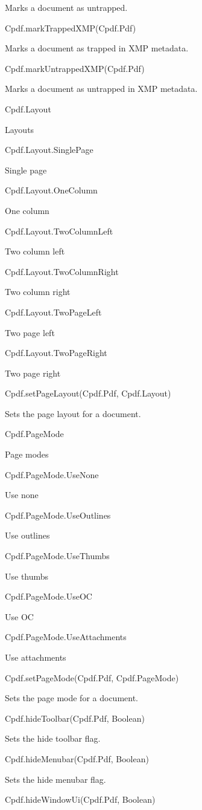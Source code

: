 Marks a document as untrapped.

Cpdf.markTrappedXMP(Cpdf.Pdf)

Marks a document as trapped in XMP metadata.

Cpdf.markUntrappedXMP(Cpdf.Pdf)

Marks a document as untrapped in XMP metadata.

Cpdf.Layout

Layouts

Cpdf.Layout.SinglePage

Single page

Cpdf.Layout.OneColumn

One column

Cpdf.Layout.TwoColumnLeft

Two column left

Cpdf.Layout.TwoColumnRight

Two column right

Cpdf.Layout.TwoPageLeft

Two page left

Cpdf.Layout.TwoPageRight

Two page right

Cpdf.setPageLayout(Cpdf.Pdf, Cpdf.Layout)

Sets the page layout for a document.

Cpdf.PageMode

Page modes

Cpdf.PageMode.UseNone

Use none

Cpdf.PageMode.UseOutlines

Use outlines

Cpdf.PageMode.UseThumbs

Use thumbs

Cpdf.PageMode.UseOC

Use OC

Cpdf.PageMode.UseAttachments

Use attachments

Cpdf.setPageMode(Cpdf.Pdf, Cpdf.PageMode)

Sets the page mode for a document.

Cpdf.hideToolbar(Cpdf.Pdf, Boolean)

Sets the hide toolbar flag.

Cpdf.hideMenubar(Cpdf.Pdf, Boolean)

Sets the hide menubar flag.

Cpdf.hideWindowUi(Cpdf.Pdf, Boolean)

